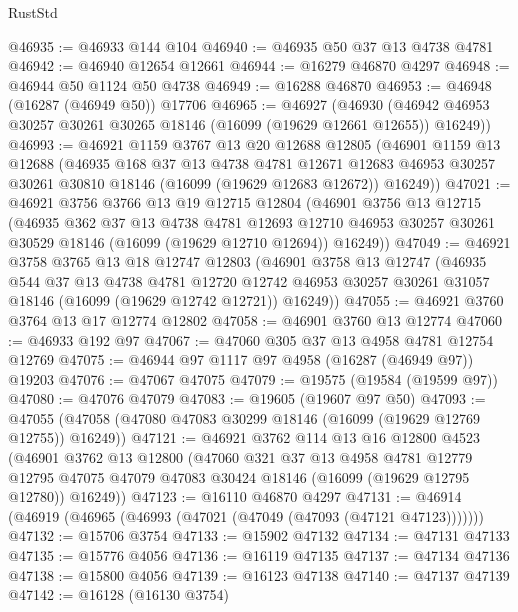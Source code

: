 \begin{lexlean}{RustStd}
\begin{coremodule}
@46935 := @46933 @144 @104
@46940 := @46935 @50 @37 @13 @4738 @4781
@46942 := @46940 @12654 @12661
@46944 := @16279 @46870 @4297
@46948 := @46944 @50 @1124 @50 @4738
@46949 := @16288 @46870
@46953 := @46948 (@16287 (@46949 @50)) @17706
@46965 := @46927
    (@46930 (@46942 @46953 @30257 @30261 @30265 @18146 (@16099 (@19629 @12661 @12655)) @16249))
@46993 := @46921
    @1159
    @3767
    @13
    @20
    @12688
    @12805
    (@46901
      @1159
      @13
      @12688
      (@46935
        @168
        @37
        @13
        @4738
        @4781
        @12671
        @12683
        @46953
        @30257
        @30261
        @30810
        @18146
        (@16099 (@19629 @12683 @12672))
        @16249))
@47021 := @46921
    @3756
    @3766
    @13
    @19
    @12715
    @12804
    (@46901
      @3756
      @13
      @12715
      (@46935
        @362
        @37
        @13
        @4738
        @4781
        @12693
        @12710
        @46953
        @30257
        @30261
        @30529
        @18146
        (@16099 (@19629 @12710 @12694))
        @16249))
@47049 := @46921
    @3758
    @3765
    @13
    @18
    @12747
    @12803
    (@46901
      @3758
      @13
      @12747
      (@46935
        @544
        @37
        @13
        @4738
        @4781
        @12720
        @12742
        @46953
        @30257
        @30261
        @31057
        @18146
        (@16099 (@19629 @12742 @12721))
        @16249))
@47055 := @46921 @3760 @3764 @13 @17 @12774 @12802
@47058 := @46901 @3760 @13 @12774
@47060 := @46933 @192 @97
@47067 := @47060 @305 @37 @13 @4958 @4781 @12754 @12769
@47075 := @46944 @97 @1117 @97 @4958 (@16287 (@46949 @97)) @19203
@47076 := @47067 @47075
@47079 := @19575 (@19584 (@19599 @97))
@47080 := @47076 @47079
@47083 := @19605 (@19607 @97 @50)
@47093 := @47055 (@47058 (@47080 @47083 @30299 @18146 (@16099 (@19629 @12769 @12755)) @16249))
@47121 := @46921
    @3762
    @114
    @13
    @16
    @12800
    @4523
    (@46901
      @3762
      @13
      @12800
      (@47060
        @321
        @37
        @13
        @4958
        @4781
        @12779
        @12795
        @47075
        @47079
        @47083
        @30424
        @18146
        (@16099 (@19629 @12795 @12780))
        @16249))
@47123 := @16110 @46870 @4297
@47131 := @46914 (@46919 (@46965 (@46993 (@47021 (@47049 (@47093 (@47121 @47123)))))))
@47132 := @15706 @3754
@47133 := @15902 @47132
@47134 := @47131 @47133
@47135 := @15776 @4056
@47136 := @16119 @47135
@47137 := @47134 @47136
@47138 := @15800 @4056
@47139 := @16123 @47138
@47140 := @47137 @47139
@47142 := @16128 (@16130 @3754)

\end{coremodule}
\end{lexlean}
